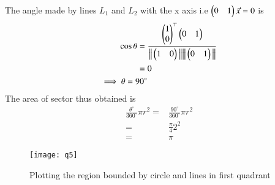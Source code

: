 \documentclass[journal,12pt,twocolumn]{IEEEtran}
\begin{document}
The angle made by lines $L_{1}$ and $L_{2}$ with the x axis i.e $\begin{pmatrix}0 & 1\end{pmatrix}\Vec{x}=0$ is
\begin{align}
\label{eq:10}
\cos \theta = {}&\frac{\begin{pmatrix}1 \\ 0\end{pmatrix}^\top \begin{pmatrix}0 & 1\end{pmatrix}}{\big\lVert\begin{pmatrix}1 & 0\end{pmatrix}\big\rVert\big\lVert\begin{pmatrix}0 & 1\end{pmatrix}\big\rVert}\\
\label{eq:11}
={}& 0\\
\label{eq:12}
\implies \theta = 90^{\circ}
\end{align}
The area of sector thus obtained is
\begin{align}
\label{eq;13}
\frac{\theta^{\circ}}{360^{\circ}}\pi r^2 ={}&\frac{90^{\circ}}{360^{\circ}}\pi r^2\\
\label{eq:14}
={}&\frac{\pi}{4}2^2\\
\label{eq:15}
={}&\pi
\end{align}
\begin{figure}[t]
\centering
\texttt{[image: q5]}
\caption{Plotting the region bounded by circle and lines in first quadrant}

\end{figure}

		
\end{document}
